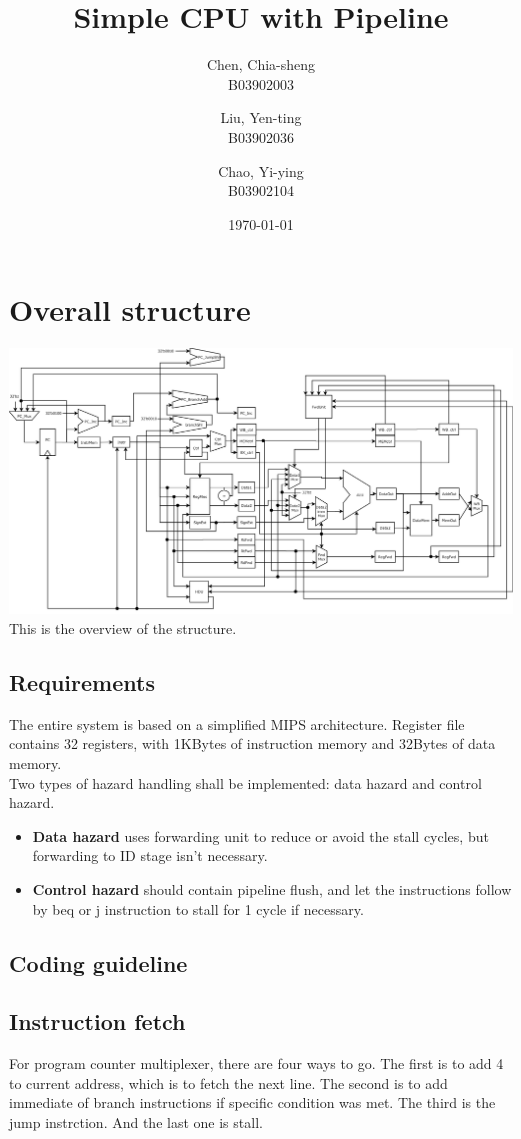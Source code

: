 \documentclass[11pt, a4paper]{article}
\title
{
	Simple CPU with Pipeline
}
\author
{
  Chen, Chia-sheng\\
  B03902003
  \and
  Liu, Yen-ting\\
  B03902036
  \and
  Chao, Yi-ying\\
  B03902104
}
\date{\today}
\begin{document}
\maketitle

\section{Overall structure}

\includegraphics[width=\textwidth]{project1}
This is the overview of the structure.

\subsection{Requirements}
The entire system is based on a simplified MIPS architecture. Register file contains 32 registers, with 1KBytes of instruction memory and 32Bytes of data memory.\\

Two types of hazard handling shall be implemented: data hazard and control hazard.
\begin{itemize}
\item \textbf{Data hazard} uses {\sc forwarding unit} to reduce or avoid the stall cycles, but forwarding to {\sc ID} stage isn't necessary. 
\item \textbf{Control hazard} should contain pipeline flush, and let the instructions follow by beq or j instruction to stall for 1 cycle if necessary.
\end{itemize}


\subsection{Coding guideline}

\subsection{Instruction fetch}
\par For program counter multiplexer, there are four ways to go. The first is to add 4 to current address, which is to fetch the next line. The second is to add immediate of branch instructions if specific condition was met. The third is the jump instrction. And the last one is stall.
\end{document}
